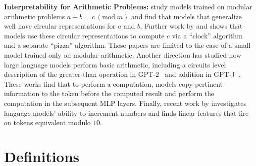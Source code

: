 \documentclass{article} %
\theoremstyle{plain}
\theoremstyle{definition}
\newcommand{\Mod}[1]{\ (\mathrm{mod}\ #1)}
\begin{document}
    
    \textbf{Interpretability for Arithmetic Problems:} \cite{ziming_grokking} study models trained on modular arithmetic problems $a + b = c \Mod{m}$ and find that models that generalize well have circular representations for $a$ and $b$. Further work by \cite{neel_grokking} and \cite{clock_and_pizza} shows that models use these circular representations to compute $c$ via a ``clock'' algorithm and a separate ``pizza'' algorithm. These papers are limited to the case of a small model trained only on modular arithmetic. Another direction has studied how large language models perform basic arithmetic, including a circuits level description of the greater-than operation in GPT-2~\citep{gpt2_greater_than} and addition in GPT-J~\citep{mechanistic_interp_arithmetic}. These works find that to perform a computation, models copy pertinent information to the token before the computed result and perform the computation in the subsequent MLP layers. Finally, recent work by \cite{successor_heads} investigates language models' ability to increment numbers and finds linear features that fire on tokens equivalent modulo $10$.
    

\section{Definitions}


\label{sec:definitions}


\end{document}

